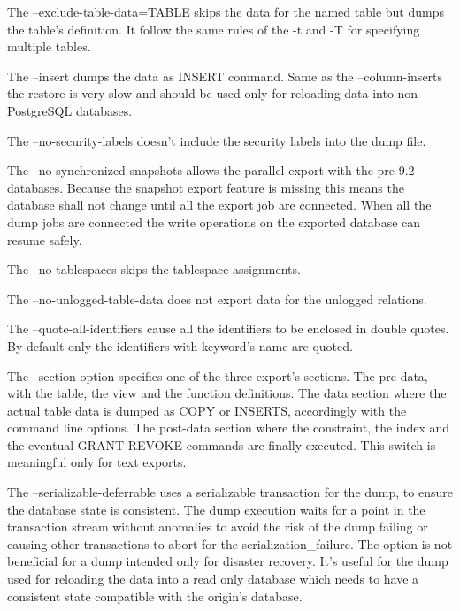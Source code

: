 The --exclude-table-data=TABLE skips the data for the named table but dumps the table's definition. 
It follow the same rules of the -t and -T for specifying multiple tables.\newline

The --insert dumps the data as INSERT command. Same as the --column-inserts the restore is very 
slow and should be used only for reloading data into non-PostgreSQL databases.\newline

The --no-security-labels doesn't include the security labels into the dump file.\newline

The --no-synchronized-snapshots  allows the parallel export with the pre 9.2 databases. Because
the snapshot export feature is missing this means the database shall not change until all the export
job are connected. When all the dump jobs are connected the write operations on the
exported database can resume safely.\newline

The --no-tablespaces skips the tablespace assignments.\newline

The --no-unlogged-table-data does not export data for the unlogged relations.\newline

The --quote-all-identifiers  cause all the identifiers to be enclosed in double quotes. By default 
only the identifiers with keyword's name are quoted.\newline

The --section option specifies one of the three export's sections. The pre-data, with the 
table, the view and the function definitions. The data section where the actual table data is 
dumped as COPY or INSERTS, accordingly with the command line options. The post-data section 
where the constraint, the index and the eventual GRANT REVOKE commands are finally executed. This 
switch is meaningful only for text exports. \newline

The --serializable-deferrable uses a serializable transaction for the dump, to ensure the database 
state is consistent. The dump execution waits for a point in the transaction stream without 
anomalies to avoid the risk of the dump failing or causing other transactions to abort for the 
serialization\_failure. The option is not beneficial for a dump intended only for disaster 
recovery. It's useful for the dump used for reloading the data into a read only database which 
needs to have a consistent state compatible with the origin's database.\newline

